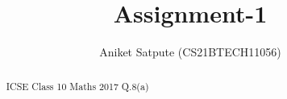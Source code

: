 \documentclass[journal,12pt,twocolumn]{IEEEtran}
\begin{document}
\newtheorem{theorem}{Theorem}[section]
\newtheorem{problem}{Problem}
\newtheorem{proposition}{Proposition}[section]
\newtheorem{lemma}{Lemma}[section]
\newtheorem{corollary}[theorem]{Corollary}
\newtheorem{example}{Example}[section]
\newtheorem{definition}[problem]{Definition}
\newcommand{\BEQA}{\begin{eqnarray}}
\newcommand{\EEQA}{\end{eqnarray}}
\newcommand{\define}{\stackrel{\triangle}{=}}
\newcommand*\circled[1]{\tikz[baseline=(char.base)]{
\node[shape=circle,draw,inner sep=2pt] (char) {#1};}}

\providecommand{\mbf}{\mathbf}
\providecommand{\pr}[1]{\ensuremath{\Pr\left(#1\right)}}
\providecommand{\qfunc}[1]{\ensuremath{Q\left(#1\right)}}
\providecommand{\sbrak}[1]{\ensuremath{{}\left[#1\right]}}
\providecommand{\lsbrak}[1]{\ensuremath{{}\left[#1\right.}}
\providecommand{\rsbrak}[1]{\ensuremath{{}\left.#1\right]}}
\providecommand{\brak}[1]{\ensuremath{\left(#1\right)}}
\providecommand{\lbrak}[1]{\ensuremath{\left(#1\right.}}
\providecommand{\rbrak}[1]{\ensuremath{\left.#1\right)}}
\providecommand{\cbrak}[1]{\ensuremath{\left\{#1\right\}}}
\providecommand{\lcbrak}[1]{\ensuremath{\left\{#1\right.}}
\providecommand{\rcbrak}[1]{\ensuremath{\left.#1\right\}}}
\theoremstyle{remark}
\newtheorem{rem}{Remark}
\newcommand{\sgn}{\mathop{\mathrm{sgn}}}
\providecommand{\fourier}{\overset{\mathcal{F}}{ \rightleftharpoons}}
\providecommand{\system}{\overset{\mathcal{H}}{ \longleftrightarrow}}
\newcommand{\solution}{\noindent \textbf{Solution: }}
\newcommand{\cosec}{\,\text{cosec}\,}
\providecommand{\dec}[2]{\ensuremath{\overset{#1}{\underset{#2}{\gtrless}}}}
\newcommand{\myvec}[1]{\ensuremath{\begin{pmatrix}#1\end{pmatrix}}}
\newcommand{\mydet}[1]{\ensuremath{\begin{vmatrix}#1\end{vmatrix}}}
\makeatletter
{}
\makeatother
\let\StandardTheFigure\thefigure
\let\vec\mathbf
\def\putbox#1#2#3{\makebox[0in][l]{\makebox[#1][l]{}\raisebox{\baselineskip}[0in][0in]{\raisebox{#2}[0in][0in]{#3}}}}
\def\rightbox#1{\makebox[0in][r]{#1}}
\def\centbox#1{\makebox[0in]{#1}}
\def\topbox#1{\raisebox{-\baselineskip}[0in][0in]{#1}}
\def\midbox#1{\raisebox{-0.5\baselineskip}[0in][0in]{#1}}
\title{Assignment-1}
\author{ Aniket Satpute (CS21BTECH11056)}
\graphicspath{{figure/}}
\maketitle
\begin{abstract}
ICSE Class 10 Maths 2017 Q.8(a)
\end{abstract}
\end{document}
